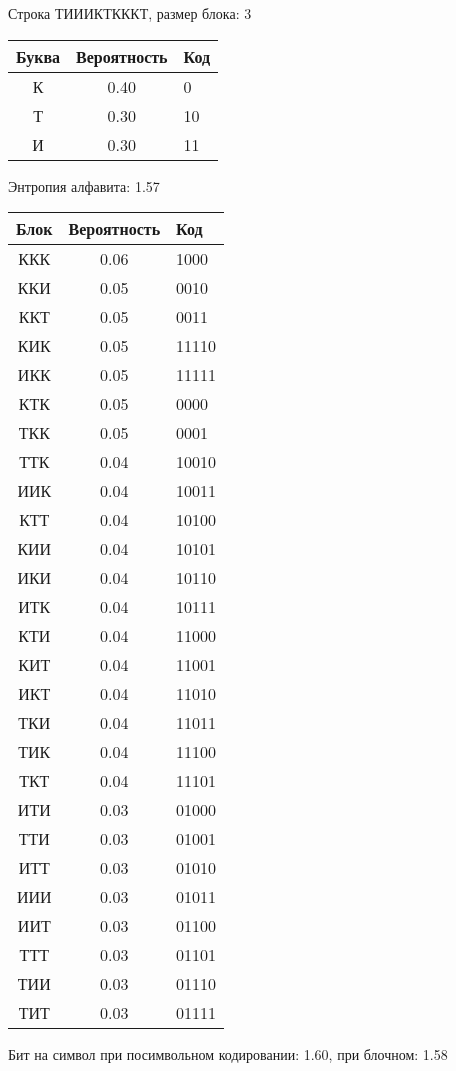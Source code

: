 \documentclass[a4paper, 12pt]{article}
\begin{document}
Строка ТИИИКТКККТ, размер блока: 3
\begin{center}
 \begin{tabular}{ |c|c|l| } 
  \hline
     Буква & Вероятность & Код\\ \hline
К & 0.40 & 0\\\hline
Т & 0.30 & 10\\\hline
И & 0.30 & 11
\\ \hline \end{tabular}
\end{center}
Энтропия алфавита: 1.57
\begin{center}
 \begin{tabular}{ |c|c|l| } 
  \hline
     Блок & Вероятность & Код\\ \hline
ККК & 0.06 & 1000\\\hline
ККИ & 0.05 & 0010\\\hline
ККТ & 0.05 & 0011\\\hline
КИК & 0.05 & 11110\\\hline
ИКК & 0.05 & 11111\\\hline
КТК & 0.05 & 0000\\\hline
ТКК & 0.05 & 0001\\\hline
ТТК & 0.04 & 10010\\\hline
ИИК & 0.04 & 10011\\\hline
КТТ & 0.04 & 10100\\\hline
КИИ & 0.04 & 10101\\\hline
ИКИ & 0.04 & 10110\\\hline
ИТК & 0.04 & 10111\\\hline
КТИ & 0.04 & 11000\\\hline
КИТ & 0.04 & 11001\\\hline
ИКТ & 0.04 & 11010\\\hline
ТКИ & 0.04 & 11011\\\hline
ТИК & 0.04 & 11100\\\hline
ТКТ & 0.04 & 11101\\\hline
ИТИ & 0.03 & 01000\\\hline
ТТИ & 0.03 & 01001\\\hline
ИТТ & 0.03 & 01010\\\hline
ИИИ & 0.03 & 01011\\\hline
ИИТ & 0.03 & 01100\\\hline
ТТТ & 0.03 & 01101\\\hline
ТИИ & 0.03 & 01110\\\hline
ТИТ & 0.03 & 01111
\\ \hline \end{tabular}
\end{center}
Бит на символ при посимвольном кодировании: 1.60, при блочном: 1.58
\end{document}
